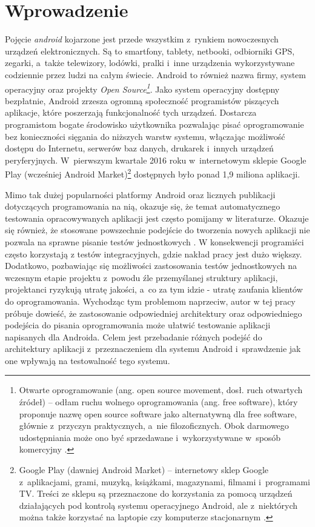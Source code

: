 \chapter{Wprowadzenie}
\label{wstep}

Pojęcie \textit{android} kojarzone jest przede wszystkim z~rynkiem nowoczesnych urządzeń elektronicznych. Są to smartfony, tablety, netbooki, odbiorniki GPS, zegarki, a~także telewizory, lodówki, pralki i~inne urządzenia wykorzystywane codziennie przez ludzi na całym świecie. Android to również nazwa firmy, system operacyjny oraz projekty \textit{Open Source\footnote{Otwarte oprogramowanie (ang. open source movement, dosł. ruch otwartych źródeł) – odłam ruchu wolnego oprogramowania (ang. free software), który proponuje nazwę open source software jako alternatywną dla free software, głównie z~przyczyn praktycznych, a~nie filozoficznych. Obok darmowego udostępniania może ono być sprzedawane i~wykorzystywane w~sposób komercyjny \cite{website:wikipedia}.}}. Jako system operacyjny dostępny bezpłatnie, Android zrzesza ogromną społeczność programistów piszących aplikacje, które poszerzają funkcjonalność tych urządzeń. Dostarcza programistom bogate środowisko użytkownika pozwalając pisać oprogramowanie bez konieczności sięgania do niższych warstw systemu, włączając możliwość dostępu do Internetu, serwerów baz danych, drukarek i~innych urządzeń peryferyjnych. W~pierwszym kwartale 2016 roku w~internetowym sklepie Google Play (wcześniej Android Market)\footnote{Google Play (dawniej Android Market) – internetowy sklep Google z~aplikacjami, grami, muzyką, książkami, magazynami, filmami i~programami TV. Treści ze sklepu są przeznaczone do korzystania za pomocą urządzeń działających pod kontrolą systemu operacyjnego Android, ale z~niektórych można także korzystać na laptopie czy komputerze stacjonarnym \cite{website:wikipedia}.} dostępnych było ponad 1,9 miliona aplikacji. 

Mimo tak dużej popularności platformy Android oraz licznych publikacji dotyczących programowania na nią, okazuje się, że temat automatycznego testowania opracowywanych aplikacji jest często pomijamy w literaturze. Okazuje się również, że stosowane powszechnie podejście do tworzenia nowych aplikacji nie pozwala na sprawne pisanie testów jednostkowych \cite{tematpracy}. W konsekwencji programiści często korzystają z testów integracyjnych, gdzie nakład pracy jest dużo większy. Dodatkowo, pozbawiając się możliwości zastosowania testów jednostkowych na wczesnym etapie projektu z~powodu źle przemyślanej struktury aplikacji, projektanci ryzykują utratę jakości, a~co za tym idzie - utratę zaufania klientów do oprogramowania. Wychodząc tym problemom naprzeciw, autor w tej pracy próbuje dowieść, że zastosowanie odpowiedniej architektury oraz odpowiedniego podejścia do pisania oprogramowania może ułatwić testowanie aplikacji napisanych dla Androida. Celem jest przebadanie różnych podejść do architektury aplikacji z~przeznaczeniem dla systemu Android i~sprawdzenie jak one wpływają na testowalność tego systemu. 

